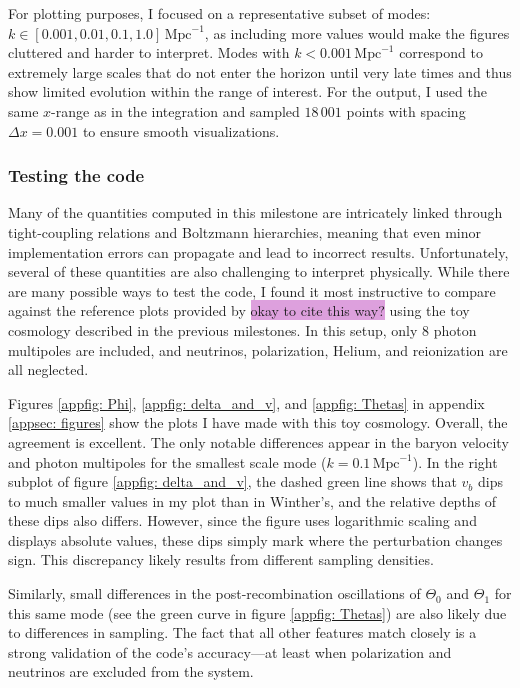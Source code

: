\documentclass{aa}
\numberwithin{equation}{section}
\numberwithin{table}{section}
\numberwithin{figure}{section}
\begin{document}
For plotting purposes, I focused on a representative subset of modes: $k \in [0.001, 0.01, 0.1, 1.0]\,\text{Mpc}^{-1}$, as including more values would make the figures cluttered and harder to interpret. Modes with $k < 0.001\,\text{Mpc}^{-1}$ correspond to extremely large scales that do not enter the horizon until very late times and thus show limited evolution within the range of interest. For the output, I used the same $x$-range as in the integration and sampled $18\,001$ points with spacing $\Delta x = 0.001$ to ensure smooth visualizations.



\subsubsection{Testing the code}
Many of the quantities computed in this milestone are intricately linked through tight-coupling relations and Boltzmann hierarchies, meaning that even minor implementation errors can propagate and lead to incorrect results. Unfortunately, several of these quantities are also challenging to interpret physically. While there are many possible ways to test the code, I found it most instructive to compare against the reference plots provided by \cite{Course} \colorbox{Plum}{okay to cite this way?}  using the toy cosmology described in the previous milestones. In this setup, only 8 photon multipoles are included, and neutrinos, polarization, Helium, and reionization are all neglected.

Figures \ref{appfig: Phi}, \ref{appfig: delta_and_v}, and \ref{appfig: Thetas} in appendix \ref{appsec: figures} show the plots I have made with this toy cosmology. Overall, the agreement is excellent. The only notable differences appear in the baryon velocity and photon multipoles for the smallest scale mode ($k=0.1\,\text{Mpc}^{-1}$). In the right subplot of figure \ref{appfig: delta_and_v}, the dashed green line shows that $v_b$ dips to much smaller values in my plot than in Winther's, and the relative depths of these dips also differs. However, since the figure uses logarithmic scaling and displays absolute values, these dips simply mark where the perturbation changes sign. This discrepancy likely results from different sampling densities.

Similarly, small differences in the post-recombination oscillations of $\Theta_0$ and $\Theta_1$ for this same mode (see the green curve in figure \ref{appfig: Thetas}) are also likely due to differences in sampling. The fact that all other features match closely is a strong validation of the code's accuracy—at least when polarization and neutrinos are excluded from the system.
\end{document}
